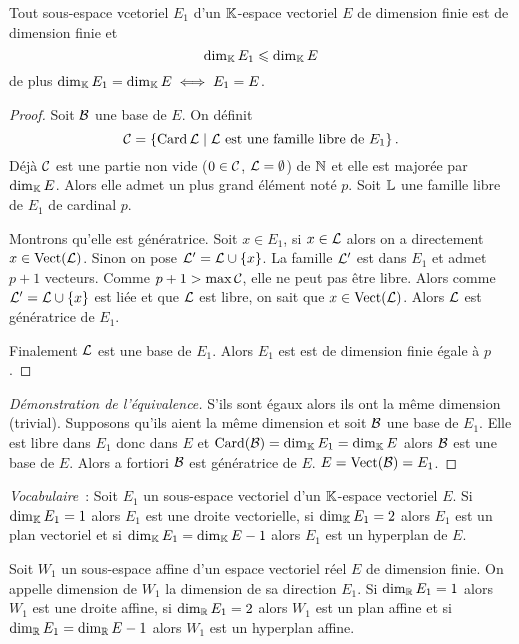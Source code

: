 \begin{theo}
  Tout sous-espace vcetoriel \(E_1\) d'un \(\mathbb{K}\)-espace vectoriel \(E\) de dimension finie est de dimension finie et
  \begin{equation}
    \operatorname{dim}_{\mathbb{K}} E_1 \leqslant \operatorname{dim}_{\mathbb{K}} E
  \end{equation}
de plus \(\operatorname{dim}_{\mathbb{K}} E_1 = \operatorname{dim}_{\mathbb{K}} E \iff E_1 =E\).
\end{theo}
\begin{proof}
  Soit \(\mathcal{B}\) une base de \(E\). On définit 
\begin{equation}
  \mathcal{C}=\left\{\operatorname{Card} \mathcal{L}\mathrel{}\middle|\mathrel{}\mathcal{L} \text{~est une famille libre de } E_1\right\}. 
\end{equation}
Déjà \(\mathcal{C}\) est une partie non vide (\(0 \in \mathcal{C}\), \(\mathcal{L}=\emptyset\)) de \(\mathbb{N}\) et elle est majorée par \(\operatorname{dim}_{\mathbb{K}} E\). Alors elle admet un plus grand élément noté \(p\). Soit \(\mathbb{L}\) une famille libre de \(E_1\) de cardinal \(p\). 

Montrons qu'elle est génératrice. Soit \(x \in E_1\), si \(x \in \mathcal{L}\) alors on a directement \(x \in \operatorname{Vect}(\mathcal{L})\). Sinon on pose \(\mathcal{L}' = \mathcal{L} \cup \{x\}\). La famille \(\mathcal{L}'\) est dans \(E_1\) et admet \(p+1\) vecteurs. Comme \(p+1 > \max \mathcal{C}\), elle ne peut pas être libre. Alors comme \(\mathcal{L}' =\mathcal{L}\cup\{x\}\) est liée et que \(\mathcal{L}\) est libre, on sait que \(x \in \operatorname{Vect}(\mathcal{L})\). Alors \(\mathcal{L}\) est génératrice de \(E_1\).

Finalement \(\mathcal{L}\) est une base de \(E_1\). Alors \(E_1\) est est de dimension finie égale à \(p\).
\end{proof}
\begin{proof}[Démonstration de l'équivalence]
  S'ils sont égaux alors ils ont la même dimension (trivial). Supposons qu'ils aient la même dimension et soit \(\mathcal{B}\) une base de \(E_1\). Elle est libre dans \(E_1\) donc dans \(E\) et \(\operatorname{Card}(\mathcal{B})=\operatorname{dim}_{\mathbb{K}} E_1=\operatorname{dim}_{\mathbb{K}} E\) alors \(\mathcal{B}\) est une base de \(E\). Alors a fortiori \(\mathcal{B}\) est génératrice de \(E\). \(E=\operatorname{Vect}(\mathcal{B})=E_1\).
\end{proof}

\emph{Vocabulaire}~: Soit \(E_1\) un sous-espace vectoriel d'un \(\mathbb{K}\)-espace vectoriel \(E\). Si \(\operatorname{dim}_{\mathbb{K}} E_1=1\) alors \(E_1\) est une droite vectorielle, si \(\operatorname{dim}_{\mathbb{K}} E_1=2\) alors \(E_1\) est un plan vectoriel et si \(\operatorname{dim}_{\mathbb{K}} E_1 = \operatorname{dim}_{\mathbb{K}} E -1\) alors \(E_1\) est un hyperplan de \(E\).

\begin{defdef}
  Soit \(W_1\) un sous-espace affine d'un espace vectoriel réel \(E\) de dimension finie. On appelle dimension de \(W_1\) la dimension de sa direction \(E_1\). Si \(\operatorname{dim}_{\mathbb{R}} E_1=1\) alors \(W_1\) est une droite affine, si \(\operatorname{dim}_{\mathbb{R}} E_1=2\) alors \(W_1\) est un plan affine et si \(\operatorname{dim}_{\mathbb{R}} E_1=\operatorname{dim}_{\mathbb{R}} E -1 \) alors \(W_1\) est un hyperplan affine.
\end{defdef}

